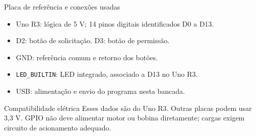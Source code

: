 \begin{frame}[t]{Placa de referência e conexões usadas}
\begin{itemize}
\item Uno R3: lógica de 5 V; 14 pinos digitais identificados D0 a D13.
\item D2: botão de solicitação. D3: botão de permissão.
\item GND: referência comum e retorno dos botões.
\item \texttt{LED\_BUILTIN}: LED integrado, associado a D13 no Uno R3.
\item USB: alimentação e envio do programa nesta bancada.
\end{itemize}
\begin{alertblock}{Compatibilidade elétrica}
Esses dados são do Uno R3. Outras placas podem usar 3,3 V. GPIO não deve alimentar motor ou bobina diretamente; cargas exigem circuito de acionamento adequado.
\end{alertblock}
\end{frame}

